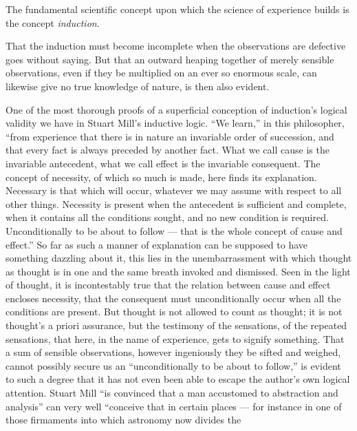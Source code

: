 \documentclass[12pt,a4paper]{book}
\begin{document}
The fundamental scientific concept upon which the science of experience builds is the
concept \emph{induction}.

That the induction must become incomplete when the observations are defective goes
without saying. But that an outward heaping together of merely sensible observations,
even if they be multiplied on an ever so enormous scale, can likewise give no true
knowledge of nature, is then also evident.

One of the most thorough proofs of a superficial conception of induction's logical
validity we have in Stuart Mill's inductive
logic. ``We learn,'' in this philosopher, ``from experience that there is in nature an
invariable order of succession, and that every fact is always preceded by another fact.
What we call cause is the invariable antecedent, what we call effect is the invariable
consequent. The concept of necessity, of which so much is made, here finds its
explanation. Necessary is that which will occur, whatever we may assume with respect to
all
other things. Necessity is present when the antecedent is sufficient and complete, when
it contains all the conditions sought, and no new condition is required.
Unconditionally to be about to follow --- that is the whole concept of cause and
effect.'' So far as such a manner of explanation can be supposed to have something
dazzling about it, this lies in the unembarrassment with which thought as thought is in
one and the same breath invoked and dismissed. Seen in the light of thought, it is
incontestably true that the relation between cause and effect encloses necessity, that
the consequent must unconditionally occur when all the conditions are present. But
thought is not allowed to count as thought; it is not thought's a priori assurance, but
the testimony of the sensations, of the repeated sensations, that here, in the name of
experience, gets to signify something. That a sum of sensible observations, however
ingeniously they be sifted and weighed, cannot possibly secure us an ``unconditionally
to be about to follow,'' is evident to such a degree that it has not even been able to
escape the author's own logical attention. Stuart Mill ``is convinced that a man
accustomed to abstraction and analysis'' can very well ``conceive that in certain
places --- for instance in one of those firmaments into which astronomy now divides the
\end{document}
